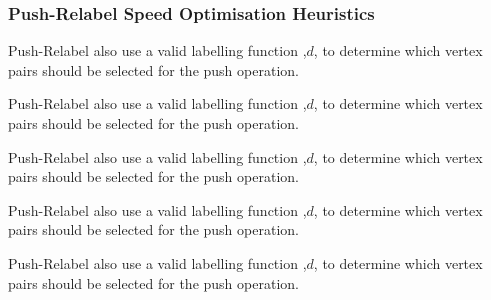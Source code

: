 
\subsubsection{Push-Relabel Speed Optimisation Heuristics}
\begin{definition}[Discharge]
	Push-Relabel also use a valid labelling function ,$d$, to determine which vertex pairs should be selected for the push operation.
\end{definition}

\begin{definition}[FIFO]
	Push-Relabel also use a valid labelling function ,$d$, to determine which vertex pairs should be selected for the push operation.
\end{definition}

\begin{definition}
	Push-Relabel also use a valid labelling function ,$d$, to determine which vertex pairs should be selected for the push operation.
\end{definition}

\begin{definition}
	Push-Relabel also use a valid labelling function ,$d$, to determine which vertex pairs should be selected for the push operation.
\end{definition}

\begin{definition}
	Push-Relabel also use a valid labelling function ,$d$, to determine which vertex pairs should be selected for the push operation.
\end{definition}
